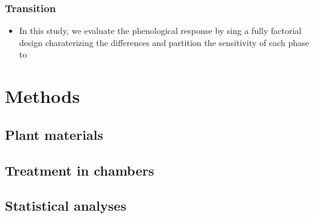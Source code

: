 \documentclass{article}\usepackage[]{graphicx}\usepackage[]{color}
\begin{document}
\subsubsection*{Transition}
\begin{itemize}
\item In this study, we evaluate the phenological response  
by sing a fully factorial design charaterizing the differences and partition the sensitivity of each phase to 
\end{itemize}
\section*{Methods}
\subsection*{Plant materials}
\subsection*{Treatment in chambers}
\subsection*{Statistical analyses}
\end{document}
